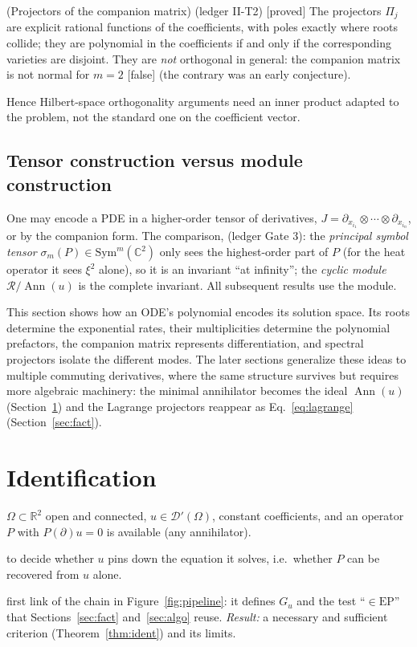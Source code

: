 \documentclass[11pt,a4paper]{article}
\theoremstyle{definition}
\newcommand{\badge}[2]{\textcolor{#1}{\textsf{\footnotesize[#2]}}}
\newcommand{\proved}[1][]{\badge{cC}{proved#1}}
\newcommand{\falsest}{\badge{cB}{false}}
\newcommand{\led}[1]{\textcolor{cG}{\textsf{\footnotesize(ledger #1)}}}
\newcommand{\sectionbrief}[3]{\begin{leadin}\begin{description}[nosep,leftmargin=3.0cm,labelwidth=2.8cm]
  \item[Starting from] #1
  \item[Why this section] #2
  \item[Role in the paper] #3
  \end{description}\end{leadin}}
\newcommand{\R}{\mathbb{R}}\newcommand{\C}{\mathbb{C}}\newcommand{\N}{\mathbb{N}}\newcommand{\Z}{\mathbb{Z}}
\newcommand{\Ann}{\operatorname{Ann}}
\newcommand{\EP}{\mathrm{EP}}
\newcommand{\ring}{\mathcal{R}}
\begin{document}
\begin{proposition}{(Projectors of the companion matrix) \led{II-T2} \proved[]}
The projectors $\Pi_j$ are explicit rational functions of the coefficients, with poles exactly where roots collide; they are polynomial in the coefficients if and only if the corresponding varieties are disjoint. They are \emph{not} orthogonal in general: the companion matrix is not normal for $m=2$ \falsest{} (the contrary was an early conjecture).
\end{proposition}
Hence Hilbert-space orthogonality arguments need an inner product adapted to the problem, not the standard one on the coefficient vector.

\subsection{Tensor construction versus module construction}
One may encode a PDE in a higher-order tensor of derivatives, $J=\partial_{x_{i_1}}\otimes\cdots\otimes\partial_{x_{i_n}}$, or by the companion form. The comparison, \led{Gate 3}: the \emph{principal symbol tensor} $\sigma_m(P)\in\mathrm{Sym}^m(\C^2)$ only sees the highest-order part of $P$ (for the heat operator it sees $\xi^2$ alone), so it is an invariant ``at infinity''; the \emph{cyclic module} $\ring/\Ann(u)$ is the complete invariant. All subsequent results use the module.

\begin{keypoint}
This section shows how an ODE's polynomial encodes its solution space. Its roots determine the exponential rates, their multiplicities determine the polynomial prefactors, the companion matrix represents differentiation, and spectral projectors isolate the different modes. The later sections generalize these ideas to multiple commuting derivatives, where the same structure survives but requires more algebraic machinery: the minimal annihilator becomes the ideal $\Ann(u)$ (Section~\ref{sec:ident}) and the Lagrange projectors reappear as Eq.~\eqref{eq:lagrange} (Section~\ref{sec:fact}).
\end{keypoint}

\section{Identification}\label{sec:ident}
\sectionbrief
{$\Omega\subset\R^2$ open and connected, $u\in\mathcal D'(\Omega)$, constant coefficients, and an operator $P$ with $P(\partial)u=0$ is available (any annihilator).}
{to decide whether $u$ pins down the equation it solves, i.e.\ whether $P$ can be recovered from $u$ alone.}
{first link of the chain in Figure~\ref{fig:pipeline}: it defines $G_u$ and the test ``$\in\EP$'' that Sections~\ref{sec:fact} and~\ref{sec:algo} reuse. \emph{Result:} a necessary and sufficient criterion (Theorem~\ref{thm:ident}) and its limits.}
\end{document}
